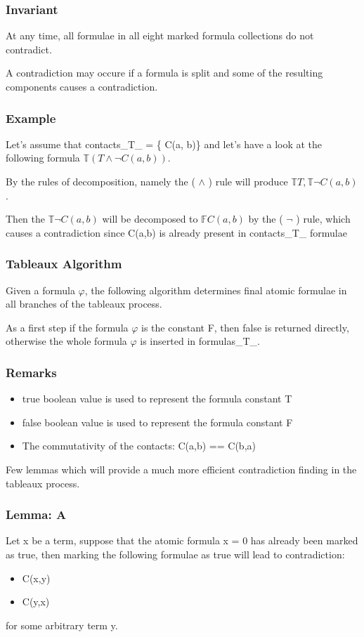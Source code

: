 \documentclass{article}
\begin{document}
		\subsubsection*{Invariant}
			At any time, all formulae in all eight marked formula collections do not contradict.

			A contradiction may occure if a formula is split and some of the resulting components causes a contradiction.

		\subsubsection*{Example}
			Let's assume that contacts\_T\_ = \{ C(a, b)\} and let's have a look at the following formula $\mathbb{T}(T \wedge \neg C(a,b))$.

			By the rules of decomposition, namely the ( $\wedge$ ) rule will produce $\mathbb{T}T, \mathbb{T}\neg C(a,b)$. 

			Then the $\mathbb{T}\neg C(a,b)$ will be decomposed to $\mathbb{F} C(a,b)$ by the ( $\neg$ ) rule, which causes a contradiction
			since C(a,b) is already present in contacts\_T\_ formulae

		\subsubsection*{Tableaux Algorithm}
			Given a formula $\varphi$, the following algorithm determines final atomic formulae in all branches of the tableaux process.

			As a first step if the formula $\varphi$ is the constant F, then false is returned directly, otherwise the whole formula $\varphi$ is inserted in formulas\_T\_.
		\newline
			\subsubsection*{Remarks}
			\begin{itemize}
				\item true boolean value is used to represent the formula constant T
				\item false boolean value is used to represent the formula constant F
				\item The commutativity of the contacts: C(a,b) == C(b,a)
			\end{itemize}
			Few lemmas which will provide a much more efficient contradiction finding in the tableaux process.
			\subsubsection*{Lemma: A}
				Let x be a term, suppose that the atomic formula x = 0 has already been marked as true,
				then marking the following formulae as true will lead to contradiction:
				\begin{itemize}
					\item C(x,y)
					\item C(y,x)
				\end{itemize}
				for some arbitrary term y.
\end{document}
